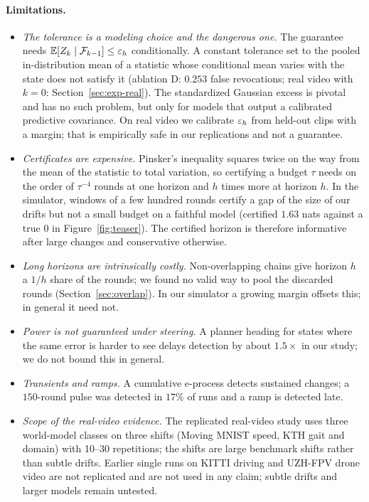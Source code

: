 \paragraph{Limitations.}
\begin{itemize}[leftmargin=1.4em,itemsep=2pt]
\item \emph{The tolerance is a modeling choice and the dangerous one.} The guarantee needs $\mathbb{E}[Z_k\mid\mathcal{F}_{k-1}]\le\varepsilon_h$ conditionally. A constant tolerance set to the pooled in-distribution mean of a statistic whose conditional mean varies with the state does not satisfy it (ablation D: $0.253$ false revocations; real video with $k=0$: Section~\ref{sec:exp-real}). The standardized Gaussian excess is pivotal and has no such problem, but only for models that output a calibrated predictive covariance.
On real video we calibrate $\varepsilon_h$ from held-out clips with a margin; that is empirically safe in our replications and not a guarantee.
\item \emph{Certificates are expensive.} Pinsker's inequality squares twice on the way from the mean of the statistic to total variation, so certifying a budget $\tau$ needs on the order of $\tau^{-4}$ rounds at one horizon and $h$ times more at horizon $h$.
In the simulator, windows of a few hundred rounds certify a gap of the size of our drifts but not a small budget on a faithful model (certified $1.63$ nats against a true $0$ in Figure~\ref{fig:teaser}). The certified horizon is therefore informative after large changes and conservative otherwise.
\item \emph{Long horizons are intrinsically costly.} Non-overlapping chains give horizon $h$ a $1/h$ share of the rounds; we found no valid way to pool the discarded rounds (Section~\ref{sec:overlap}). In our simulator a growing margin offsets this; in general it need not.
\item \emph{Power is not guaranteed under steering.} A planner heading for states where the same error is harder to see delays detection by about $1.5\times$ in our study; we do not bound this in general.
\item \emph{Transients and ramps.} A cumulative e-process detects sustained changes; a $150$-round pulse was detected in $17\%$ of runs and a ramp is detected late.
\item \emph{Scope of the real-video evidence.} The replicated real-video study uses three world-model classes on three shifts (Moving MNIST speed, KTH gait and domain) with 10--30 repetitions; the shifts are large benchmark shifts rather than subtle drifts. Earlier single runs on KITTI driving and UZH-FPV drone video are not replicated and are not used in any claim; subtle drifts and larger models remain untested.

\end{itemize}
